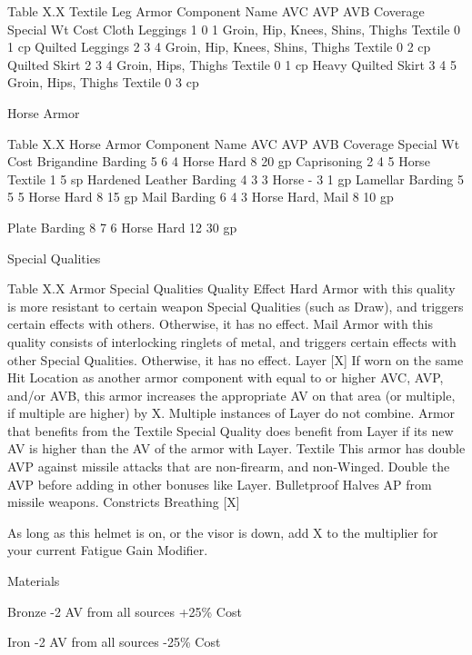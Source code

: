 \documentclass[oneside,11pt,english]{book}
\begin{document}
 
Table X.X Textile Leg Armor 
Component Name AVC AVP AVB Coverage Special Wt Cost 
Cloth Leggings 1 0 1 Groin, Hip, Knees, Shins, Thighs Textile 0 1 cp 
Quilted Leggings 2 3 4 Groin, Hip, Knees, Shins, Thighs Textile 0 2 cp 
Quilted Skirt 2 3 4 Groin, Hips, Thighs Textile 0 1 cp 
Heavy Quilted Skirt 3 4 5 Groin, Hips, Thighs Textile 0 3 cp 

 

Horse Armor 

 

Table X.X Horse Armor 
Component Name AVC AVP AVB Coverage Special Wt Cost 
Brigandine Barding 5 6 4 Horse Hard 8 20 gp 
Caprisoning 2 4 5 Horse Textile 1 5 sp 
Hardened Leather Barding 4 3 3 Horse - 3 1 gp 
Lamellar Barding 5 5 5 Horse Hard 8 15 gp 
Mail Barding 6 4 3 Horse Hard, Mail 8 10 gp 


Plate Barding 8 7 6 Horse Hard 12 30 gp 

 

Special Qualities 

 

Table X.X Armor Special Qualities 
Quality Effect 
Hard Armor with this quality is more resistant to certain weapon Special Qualities (such as Draw), and 
triggers certain effects with others. Otherwise, it has no effect. 
Mail Armor with this quality consists of interlocking ringlets of metal, and triggers certain effects with 
other Special Qualities. Otherwise, it has no effect. 
Layer [X] If worn on the same Hit Location as another armor component with equal to or higher AVC, AVP, 
and/or AVB, this armor increases the appropriate AV on that area (or multiple, if multiple are 
higher) by X. Multiple instances of Layer do not combine. Armor that benefits from the Textile 
Special Quality does benefit from Layer if its new AV is higher than the AV of the armor with 
Layer. 
Textile This armor has double AVP against missile attacks that are non-firearm, and non-Winged. Double 
the AVP before adding in other bonuses like Layer. 
Bulletproof Halves AP from missile weapons. 
Constricts 
Breathing [X] 

As long as this helmet is on, or the visor is down, add X to the multiplier for your current Fatigue 
Gain Modifier. 

 

Materials 

 

Bronze 
-2 AV from all sources 
+25\% Cost 

 

Iron 
-2 AV from all sources 
-25\% Cost 
\end{document}
